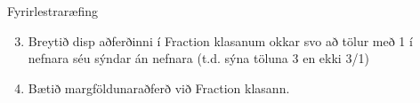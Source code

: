 \documentclass[handout]{beamer}
\begin{document}
\begin{frame}[fragile]{Fyrirlestraræfing}
    \begin{enumerate}
        \setcounter{enumi}{2}
        \item Breytið disp aðferðinni í Fraction klasanum okkar svo að tölur með 1 í nefnara séu sýndar án nefnara (t.d. sýna töluna 3 en ekki 3/1)
        \item Bætið margföldunaraðferð við Fraction klasann.
    \end{enumerate}
\end{frame}
\end{document}

